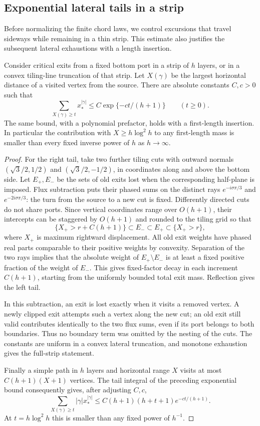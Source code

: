 \subsection{Exponential lateral tails in a strip}

Before normalizing the finite chord laws, we control excursions that
travel sideways while remaining in a thin strip. This estimate also
justifies the subsequent lateral exhaustions with a length insertion.

\begin{lemma}\label{lem:pv:lateral-tail}
Consider critical exits from a fixed bottom port in a strip of $h$
layers, or in a convex tiling-line truncation of that strip. Let
$X(\gamma)$ be the largest horizontal distance of a visited vertex
from the source. There are absolute constants $C,c>0$ such that
\[
 \sum_{X(\gamma)\ge t}x_*^{|\gamma|}
 \le C\exp\{-ct/(h+1)\}\qquad(t\ge0).
\]
The same bound, with a polynomial prefactor, holds with a first-length
insertion. In particular the contribution with
$X\ge h\log^2h$ to any first-length mass is smaller than every
fixed inverse power of $h$ as $h\to\infty$.
\end{lemma}

\begin{proof}
For the right tail, take two further tiling cuts with outward normals
$(\sqrt3/2,1/2)$ and $(\sqrt3/2,-1/2)$, in coordinates along and
above the bottom side. Let $E_+,E_-$ be the sets of old exits lost when
the corresponding half-plane is imposed. Flux subtraction puts their
phased sums on the distinct rays
$e^{-i\sigma\pi/3}$ and $e^{-2i\sigma\pi/3}$: the turn from the
source to a new cut is fixed. Differently directed cuts do not share
ports. Since vertical coordinates range over $O(h+1)$, their
intercepts can be staggered by $O(h+1)$ and rounded to the tiling grid
so that
\[
 \{X_+>r+C(h+1)\}\subset E_-\subset E_+
 \subset\{X_+>r\},
\]
where $X_+$ is maximum rightward displacement. All old exit weights
have phased real parts comparable to their positive weights by
convexity. Separation of the two rays implies that the absolute
weight of $E_+\setminus E_-$ is at least a fixed positive fraction
of the weight of $E_-$. This gives fixed-factor decay in each
increment $C(h+1)$, starting from the uniformly bounded total exit
mass. Reflection gives the left tail.

In this subtraction, an exit is lost exactly when it visits a removed
vertex. A newly clipped exit attempts such a vertex along the new
cut; an old exit still valid contributes identically to the two flux
sums, even if its port belongs to both boundaries. Thus no boundary
term was omitted by the nesting of the cuts. The constants are
uniform in a convex lateral truncation, and monotone exhaustion
gives the full-strip statement.

Finally a simple path in $h$ layers and horizontal range $X$ visits
at most $C(h+1)(X+1)$ vertices. The tail integral of the preceding
exponential bound consequently gives, after adjusting $C,c$,
\[
 \sum_{X(\gamma)\ge t}|\gamma|x_*^{|\gamma|}
 \le C(h+1)(h+t+1)e^{-ct/(h+1)}.
\]
At $t=h\log^2h$ this is smaller than any fixed power of $h^{-1}$.
\end{proof}

